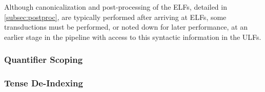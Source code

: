 Although canonicalization and post-processing of the ELFs, detailed in \ref{subsec:postproc}, are typically performed after arriving at ELFs, some transductions must be performed, or noted down for later performance, at an earlier stage in the pipeline with access to this syntactic information in the ULFs.


\subsubsection{Quantifier Scoping}

\subsubsection{Tense De-Indexing}

